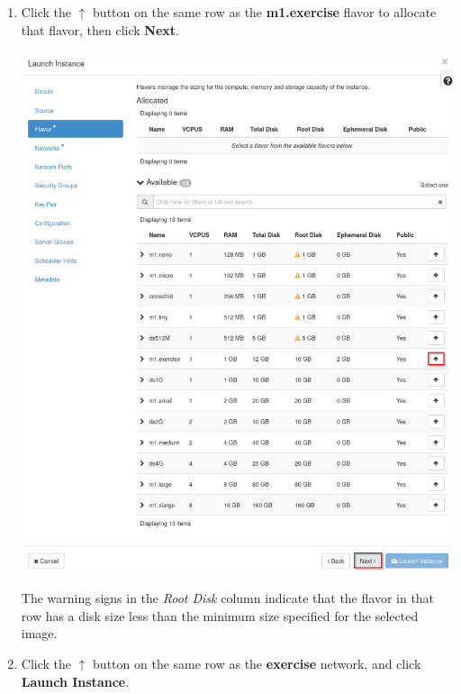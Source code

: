 \documentclass[letterpaper, 12pt]{article}
\begin{document}
\begin{enumerate}
    \item Click the $\uparrow$ button on the same row as the \textbf{m1.exercise} flavor to allocate that flavor, then
    click \textbf{Next}.
    \begin{center}
        \includegraphics[width=\linewidth]{images/part4/step5.png}
    \end{center}

    \begin{notebox}
        The warning signs in the \textit{Root Disk} column indicate that the flavor in that row has a disk size less
        than the minimum size specified for the selected image.
    \end{notebox}

    \item Click the $\uparrow$ button on the same row as the \textbf{exercise} network, and click \textbf{Launch
    Instance}.


\end{enumerate}
\end{document}
